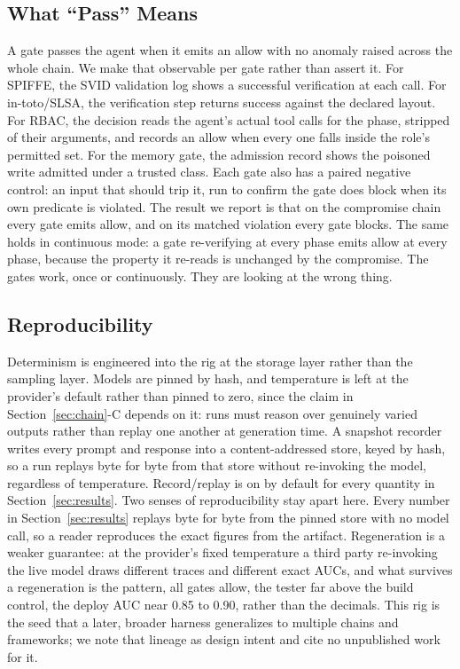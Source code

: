 \documentclass[conference]{IEEEtran}
\begin{document}
\subsection{What ``Pass'' Means}

A gate passes the agent when it emits an allow with no anomaly raised across the whole chain. We make that observable per gate rather than assert it. For SPIFFE, the SVID validation log shows a successful verification at each call. For in-toto/SLSA, the verification step returns success against the declared layout. For RBAC, the decision reads the agent's actual tool calls for the phase, stripped of their arguments, and records an allow when every one falls inside the role's permitted set. For the memory gate, the admission record shows the poisoned write admitted under a trusted class. Each gate also has a paired negative control: an input that should trip it, run to confirm the gate does block when its own predicate is violated. The result we report is that on the compromise chain every gate emits allow, and on its matched violation every gate blocks. The same holds in continuous mode: a gate re-verifying at every phase emits allow at every phase, because the property it re-reads is unchanged by the compromise. The gates work, once or continuously. They are looking at the wrong thing.

\subsection{Reproducibility}

Determinism is engineered into the rig at the storage layer rather than the sampling layer. Models are pinned by hash, and temperature is left at the provider's default rather than pinned to zero, since the claim in Section~\ref{sec:chain}-C depends on it: runs must reason over genuinely varied outputs rather than replay one another at generation time. A snapshot recorder writes every prompt and response into a content-addressed store, keyed by hash, so a run replays byte for byte from that store without re-invoking the model, regardless of temperature. Record/replay is on by default for every quantity in Section~\ref{sec:results}. Two senses of reproducibility stay apart here. Every number in Section~\ref{sec:results} replays byte for byte from the pinned store with no model call, so a reader reproduces the exact figures from the artifact. Regeneration is a weaker guarantee: at the provider's fixed temperature a third party re-invoking the live model draws different traces and different exact AUCs, and what survives a regeneration is the pattern, all gates allow, the tester far above the build control, the deploy AUC near 0.85 to 0.90, rather than the decimals. This rig is the seed that a later, broader harness generalizes to multiple chains and frameworks; we note that lineage as design intent and cite no unpublished work for it.
\end{document}
